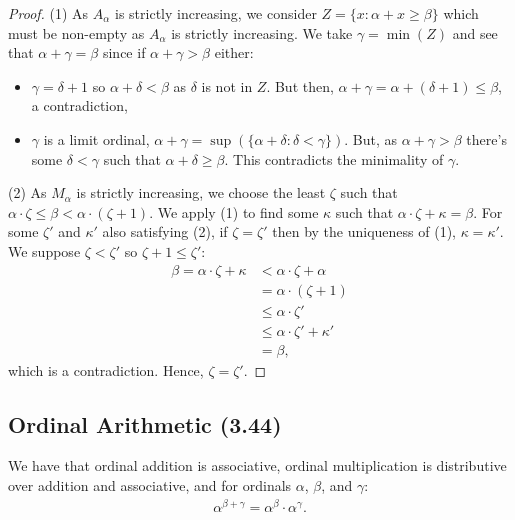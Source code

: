 \begin{proof}
    (1) As $A_\alpha$ is strictly increasing, we consider 
    $Z = \{x : \alpha + x \geq \beta\}$ which must be non-empty as
    $A_\alpha$ is strictly increasing.
    We take $\gamma = \min(Z)$ and see that $\alpha + \gamma = \beta$
    since if $\alpha + \gamma > \beta$ either: \begin{itemize}
        \item $\gamma = \delta + 1$ so $\alpha + \delta < \beta$ as
            $\delta$ is not in $Z$. But then,
            $ \alpha + \gamma = \alpha + (\delta + 1) \leq \beta$,
            a contradiction,
        \item $\gamma$ is a limit ordinal, $\alpha + \gamma =
            \sup(\{\alpha + \delta : \delta < \gamma\})$. But,
            as $\alpha + \gamma > \beta$ there's some $\delta < \gamma$
            such that $\alpha + \delta \geq \beta$. 
            This contradicts the minimality of $\gamma$.
    \end{itemize} 
    (2) As $M_\alpha$ is strictly increasing, we choose the least
    $\zeta$ such that
     $\alpha \cdot \zeta \leq \beta < \alpha \cdot (\zeta + 1)$. We apply
     (1) to find some $\kappa$ such that $\alpha \cdot \zeta + \kappa = \beta$.
     For some $\zeta'$ and $\kappa'$ also satisfying (2), if $\zeta = \zeta'$
     then by the uniqueness of (1), $\kappa = \kappa'$. We suppose
     $\zeta < \zeta'$ so $\zeta + 1 \leq \zeta'$: \begin{align*}
         \beta = \alpha \cdot \zeta + \kappa &< \alpha \cdot \zeta + \alpha \\
         &= \alpha \cdot (\zeta + 1) \\
         &\leq \alpha \cdot \zeta' \\
         &\leq \alpha \cdot \zeta' + \kappa' \\
         &= \beta,
     \end{align*} which is a contradiction. Hence, $\zeta = \zeta'$.
\end{proof}

\subsection{Ordinal Arithmetic (3.44)} \label{3.44}

We have that ordinal addition is associative, ordinal multiplication is distributive 
over addition and associative, and for ordinals $\alpha$, $\beta$, and $\gamma$: \begin{align*}
    \alpha^{\beta + \gamma} = \alpha^\beta \cdot \alpha^\gamma.
\end{align*}
